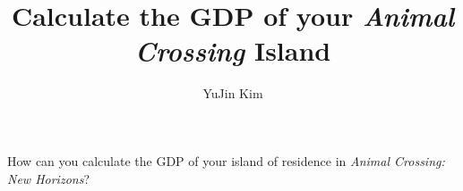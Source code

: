 \documentclass[12pt]{article}
\title{Calculate the GDP of your \textit{Animal Crossing} Island}
\author{YuJin Kim}
\begin{document}
    \maketitle

    How can you calculate the GDP of your island of residence in \textit{Animal Crossing: New Horizons}?
\end{document}
